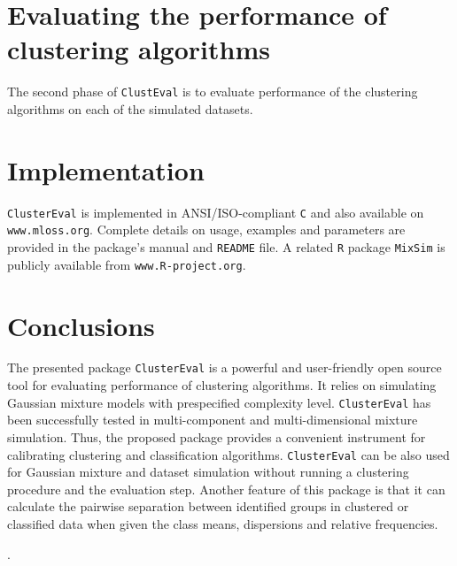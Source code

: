 \documentclass[twoside,11pt]{article}
\begin{document}
\section{Evaluating the performance of clustering algorithms}
\label{clusteval}
The second phase of {\tt ClustEval} is to evaluate performance of the
clustering algorithms on each of the simulated datasets. 

\section{Implementation}
\texttt{ClusterEval} is implemented in ANSI/ISO-compliant \texttt{C} and
also available on 
{\tt www.mloss.org}. Complete details on usage, examples and
parameters are provided in the package's manual and \texttt{README} file. A
related {\tt R} package {\tt MixSim} is publicly available from \texttt{www.R-project.org}.

\section{Conclusions}

The presented package \texttt{ClusterEval} is a powerful and user-friendly open source tool for evaluating performance of clustering algorithms. It relies on simulating Gaussian mixture models with prespecified complexity level. \texttt{ClusterEval} has been successfully tested in multi-component and multi-dimensional mixture simulation. Thus, the proposed package provides a convenient instrument for calibrating clustering and classification algorithms.
\texttt{ClusterEval} can be also used for Gaussian mixture and dataset simulation without running a clustering procedure and the evaluation step. Another feature of this package is that it can calculate the pairwise separation between identified groups in clustered or classified data when given the class means, dispersions and relative frequencies.
 

.


\vskip 0.2in

\end{document}
